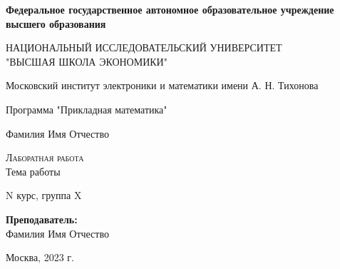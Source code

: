 \documentclass{article}
\begin{document}
\begin{titlepage}
  \begin{center}
    \large

    \textbf{Федеральное государственное автономное образовательное учреждение высшего образования}
    \vspace{0.5cm}

    НАЦИОНАЛЬНЫЙ ИССЛЕДОВАТЕЛЬСКИЙ УНИВЕРСИТЕТ \\ "ВЫСШАЯ ШКОЛА ЭКОНОМИКИ"
    \vspace{0.5cm}

    Московский институт электроники и математики имени А. Н. Тихонова

    Программа "Прикладная математика"
    \vfill


    Фамилия Имя Отчество
    \vfill

    \textsc{Лаборатная работа}\\[5mm]

    {\LARGE Тема работы\\[2mm]
    }
  \bigskip

    N курс, группа X
\end{center}
\vfill



\hfill\begin{flushright}
  \textbf{Преподаватель:}\\
  Фамилия Имя Отчество
\end{flushright}%
\vfill

\begin{center}
  Москва, 2023 г.
\end{center}
\end{titlepage}
\end{document}
